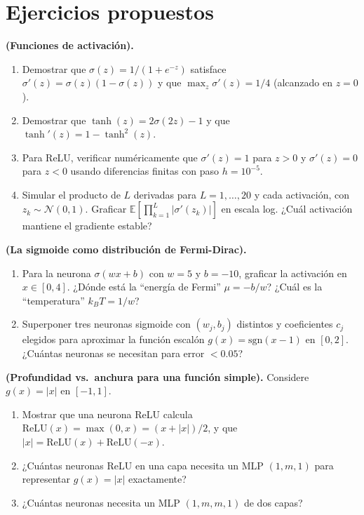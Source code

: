 \section*{Ejercicios propuestos}

\begin{ejercicio}
\textbf{(Funciones de activación).}
\begin{enumerate}[label=(\alph*)]
  \item Demostrar que $\sigma(z) = 1/(1+e^{-z})$ satisface
        $\sigma'(z) = \sigma(z)(1-\sigma(z))$ y que $\max_z \sigma'(z)
        = 1/4$ (alcanzado en $z = 0$).
  \item Demostrar que $\tanh(z) = 2\sigma(2z) - 1$ y que
        $\tanh'(z) = 1 - \tanh^2(z)$.
  \item Para ReLU, verificar numéricamente que $\sigma'(z) = 1$ para
        $z > 0$ y $\sigma'(z) = 0$ para $z < 0$ usando diferencias
        finitas con paso $h = 10^{-5}$.
  \item Simular el producto de $L$ derivadas para $L = 1, \ldots, 20$
        y cada activación, con $z_k \sim \mathcal{N}(0, 1)$. Graficar
        $\mathbb{E}[\prod_{k=1}^L|\sigma'(z_k)|]$ en escala log. ¿Cuál
        activación mantiene el gradiente estable?
\end{enumerate}
\end{ejercicio}

\begin{ejercicio}
\textbf{(La sigmoide como distribución de Fermi-Dirac).}
\begin{enumerate}[label=(\alph*)]
  \item Para la neurona $\sigma(wx+b)$ con $w = 5$ y $b = -10$,
        graficar la activación en $x \in [0, 4]$. ¿Dónde está la
        ``energía de Fermi'' $\mu = -b/w$? ¿Cuál es la ``temperatura''
        $k_BT = 1/w$?
  \item Superponer tres neuronas sigmoide con $(w_j, b_j)$ distintos y
        coeficientes $c_j$ elegidos para aproximar la función escalón
        $g(x) = \text{sgn}(x-1)$ en $[0, 2]$. ¿Cuántas neuronas se
        necesitan para error $< 0.05$?
\end{enumerate}
\end{ejercicio}

\begin{ejercicio}
\textbf{(Profundidad vs.\ anchura para una función simple).}
Considere $g(x) = |x|$ en $[-1, 1]$.
\begin{enumerate}[label=(\alph*)]
  \item Mostrar que una neurona ReLU calcula
        $\text{ReLU}(x) = \max(0, x) = (x + |x|)/2$, y que
        $|x| = \text{ReLU}(x) + \text{ReLU}(-x)$.
  \item ¿Cuántas neuronas ReLU en una capa necesita un MLP $(1, m, 1)$
        para representar $g(x) = |x|$ exactamente?
  \item ¿Cuántas neuronas necesita un MLP $(1, m, m, 1)$ de dos capas?
\end{enumerate}
\end{ejercicio}

